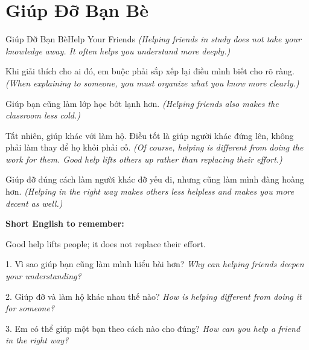 \section{Giúp Đỡ Bạn Bè}
\begin{truyen}{Giúp Đỡ Bạn Bè}{Help Your Friends}
\textit{(Helping friends in study does not take your knowledge away. It often helps you understand more deeply.)}

Khi giải thích cho ai đó, em buộc phải sắp xếp lại điều mình biết cho rõ ràng.
\textit{(When explaining to someone, you must organize what you know more clearly.)}

Giúp bạn cũng làm lớp học bớt lạnh hơn.
\textit{(Helping friends also makes the classroom less cold.)}

Tất nhiên, giúp khác với làm hộ. Điều tốt là giúp người khác đứng lên, không phải làm thay để họ khỏi phải cố.
\textit{(Of course, helping is different from doing the work for them. Good help lifts others up rather than replacing their effort.)}
\end{truyen}

\begin{baihoc}
Giúp đỡ đúng cách làm người khác đỡ yếu đi, nhưng cũng làm mình đàng hoàng hơn.
\textit{(Helping in the right way makes others less helpless and makes you more decent as well.)}
\end{baihoc}

\begin{ghinhoanh}
\textbf{Short English to remember:}

Good help lifts people; it does not replace their effort.

\end{ghinhoanh}

\begin{tuhocnhanh}
1. Vì sao giúp bạn cũng làm mình hiểu bài hơn? \textit{Why can helping friends deepen your understanding?}

2. Giúp đỡ và làm hộ khác nhau thế nào? \textit{How is helping different from doing it for someone?}

3. Em có thể giúp một bạn theo cách nào cho đúng? \textit{How can you help a friend in the right way?}
\end{tuhocnhanh}
\ngancach

